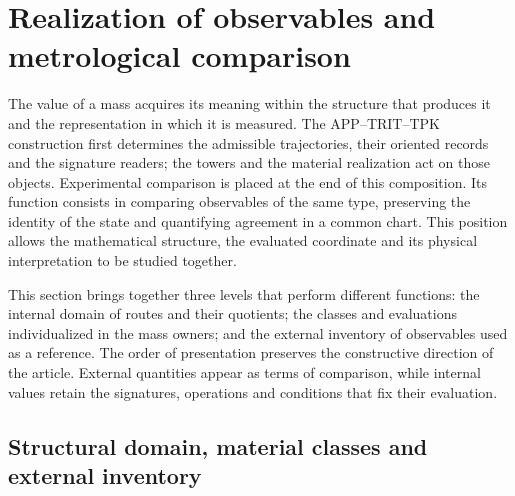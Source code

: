 
\section{Realization of observables and metrological comparison}
\label{vi:sec:vi-contraste-metrologico}

The value of a mass acquires its meaning within the structure that
produces it and the representation in which it is measured. The
APP--TRIT--TPK construction first determines the admissible trajectories, their oriented
records and the signature readers; the towers and the material realization
act on those objects. Experimental comparison is placed at the end of
this composition. Its function consists in comparing observables of the same
type, preserving the identity of the state and quantifying agreement in a
common chart. This position allows the mathematical structure,
the evaluated coordinate and its physical interpretation to be studied together.

This section brings together three levels that perform different functions:
the internal domain of routes and their quotients; the classes and evaluations
individualized in the mass owners; and the external inventory of
observables used as a reference. The order of presentation preserves the
constructive direction of the article. External quantities appear as
terms of comparison, while internal values retain the signatures,
operations and conditions that fix their evaluation.

\subsection{Structural domain, material classes and external inventory}
\label{vi:subsec:vi-dominios-contraste}

